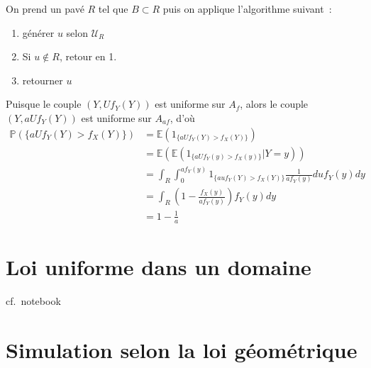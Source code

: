 \label{V-answer-simunibor}
On prend un pavé \(R\) tel que \(B \subset R\) puis on applique
l'algorithme suivant~:

\begin{enumerate}
\def\labelenumi{\arabic{enumi}.}
\tightlist
\item
  générer \(u\) selon \(\mathcal{U}_R\)
\item
  Si \(u \notin R\), retour en 1.
\item
  retourner \(u\)
\end{enumerate}

\label{V-answer-tauxrej}
Puisque le couple \((Y, Uf_Y(Y))\) est uniforme sur \(A_f\), alors le
couple \((Y, aUf_Y(Y))\) est uniforme sur \(A_{af}\), d'où
\begin{align*}
\mathbb{P}(\{aUf_Y(Y) > f_X(Y)\}) & = \mathbb{E}(1_{\{aUf_Y(Y) > f_X(Y)\}}) \\
& = \mathbb{E}(\mathbb{E}(1_{\{aUf_Y(y) > f_X(y)\}}|Y=y)) \\
& = \int_R \int_0^{af_Y(y)} 1_{\{auf_Y(Y) > f_X(Y)\}} \frac{1}{af_Y(y)} du f_Y(y) dy \\
& = \int_R \left(1 - \frac{f_X(y)}{af_Y(y)}\right) f_Y(y) dy \\
& = 1 - \frac{1}{a}
\end{align*}

\section{Loi uniforme dans un
domaine}\label{V-loi-uniforme-dans-un-domaine-1}

cf.~notebook

\section{Simulation selon la loi
géométrique}\label{V-simulation-selon-la-loi-guxe9omuxe9trique-1}

